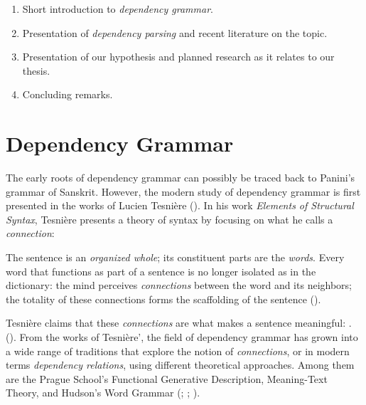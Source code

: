 \documentclass[10pt]{article}
\begin{document}
\begin{enumerate}
\item Short introduction to \textit{dependency grammar}.
\item Presentation of \textit{dependency parsing} and recent literature on the topic.
\item Presentation of our hypothesis and planned research as it relates to our thesis.
\item Concluding remarks.
\end{enumerate}

\section{Dependency Grammar}

The early roots of dependency grammar can possibly be traced back to Panini's grammar of Sanskrit. However, the modern study of dependency grammar is first presented in the works of Lucien Tesni\`ere (\cite{tesniere2015elements}). In his work \textit{Elements of Structural Syntax}, Tesni\`ere presents a theory of syntax by focusing on what he calls a \textit{connection}: 

\begin{displayquote}
The sentence is an \textit{organized whole}; its constituent parts are the \textit{words}. Every word that functions as part of a sentence is no longer isolated as in the dictionary: the mind perceives \textit{connections} between the word and its neighbors; the totality of these connections forms the scaffolding of the sentence (\cite{tesniere2015elements}).
\end{displayquote}

Tesni\`ere claims that these \textit{connections} are what makes a sentence meaningful: . (\cite{tesniere2015elements}). From the works of Tesni\`ere', the field of dependency grammar has grown into a wide range of traditions that explore the notion of \textit{connections}, or in modern terms \textit{dependency relations}, using different theoretical approaches. Among them are the Prague School's Functional Generative Description, Meaning-Text Theory, and Hudson's Word Grammar (\cite{sgall1986meaning}; \cite{melcuk}; \cite{hudson1990english}).
\end{document}
